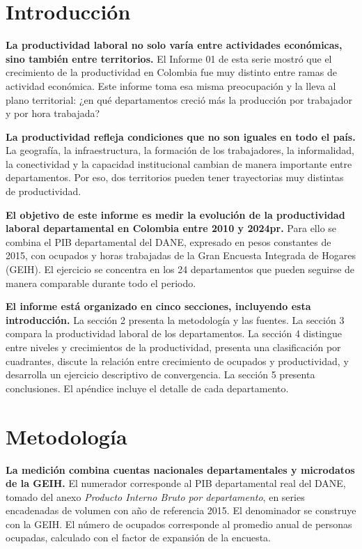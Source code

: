 \section{Introducción}

\textbf{La productividad laboral no solo varía entre actividades económicas, sino también entre territorios.} El Informe 01 de esta serie mostró que el crecimiento de la productividad en Colombia fue muy distinto entre ramas de actividad económica. Este informe toma esa misma preocupación y la lleva al plano territorial: ¿en qué departamentos creció más la producción por trabajador y por hora trabajada?

\textbf{La productividad refleja condiciones que no son iguales en todo el país.} La geografía, la infraestructura, la formación de los trabajadores, la informalidad, la conectividad y la capacidad institucional cambian de manera importante entre departamentos. Por eso, dos territorios pueden tener trayectorias muy distintas de productividad.

\textbf{El objetivo de este informe es medir la evolución de la productividad laboral departamental en Colombia entre 2010 y 2024pr.} Para ello se combina el PIB departamental del DANE, expresado en pesos constantes de 2015, con ocupados y horas trabajadas de la Gran Encuesta Integrada de Hogares (GEIH). El ejercicio se concentra en los 24 departamentos que pueden seguirse de manera comparable durante todo el periodo.

\textbf{El informe está organizado en cinco secciones, incluyendo esta introducción.} La sección 2 presenta la metodología y las fuentes. La sección 3 compara la productividad laboral de los departamentos. La sección 4 distingue entre niveles y crecimientos de la productividad, presenta una clasificación por cuadrantes, discute la relación entre crecimiento de ocupados y productividad, y desarrolla un ejercicio descriptivo de convergencia. La sección 5 presenta conclusiones. El apéndice incluye el detalle de cada departamento.

\section{Metodología}

\textbf{La medición combina cuentas nacionales departamentales y microdatos de la GEIH.} El numerador corresponde al PIB departamental real del DANE, tomado del anexo \textit{Producto Interno Bruto por departamento}, en series encadenadas de volumen con año de referencia 2015. El denominador se construye con la GEIH. El número de ocupados corresponde al promedio anual de personas ocupadas, calculado con el factor de expansión de la encuesta.


